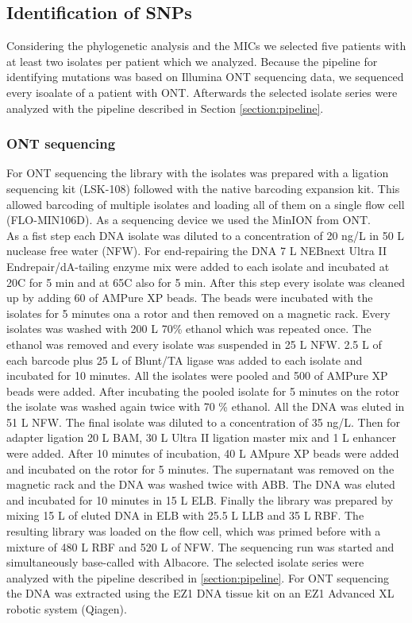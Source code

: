\subsection{Identification of SNPs}
Considering the phylogenetic analysis and the MICs we selected five patients with at least two isolates per patient which we analyzed. Because the pipeline for identifying mutations was based on Illumina ONT sequencing data, we sequenced every isoalate of a patient with ONT. 
Afterwards the selected isolate series were analyzed with the pipeline described in Section \ref{section:pipeline}.
\subsubsection{ONT sequencing}
For ONT sequencing the library with the isolates was prepared with a ligation sequencing kit (LSK-108) followed with the native barcoding expansion kit. This allowed barcoding of multiple isolates and loading all of them on a single flow cell (FLO-MIN106D). As a sequencing device we used the MinION from ONT. \\
As a fist step each DNA isolate was diluted to a concentration of 20 ng/\textmu L in 50 \textmu L nuclease free water (NFW). For end-repairing the DNA 7 \textmu L NEBnext Ultra II Endrepair/dA-tailing enzyme mix were added to each
isolate and incubated at 20\degree C for 5 min and at 65\degree C also for 5 min. After this step every isolate was cleaned up by adding 60 \textmu of AMPure XP beads. The beads were incubated with the isolates for 5 minutes ona a rotor and then removed on a magnetic rack. Every isolates was washed with 200 \textmu L 70\% ethanol which was repeated once. The ethanol was removed and every isolate was suspended in 25 \textmu L NFW. 2.5 \textmu L of each barcode plus 25 \textmu L of Blunt/TA ligase was added to each isolate and incubated for 10 minutes. All the isolates were pooled and 500 \textmu of AMPure XP beads were added. After incubating the pooled isolate for 5 minutes on the rotor the isolate was washed again twice with 70 \% ethanol. All the DNA was eluted in 51 \textmu L NFW. The final isolate was diluted to a concentration of 35 ng/\textmu L. Then for adapter ligation 20 \textmu L BAM, 30 \textmu L Ultra II ligation master mix and 1 \textmu L enhancer were added. After 10 minutes of incubation, 40 \textmu L AMpure XP beads were added and incubated on the rotor for 5 minutes. The supernatant was removed on the magnetic rack and the DNA was washed twice with ABB. The DNA was eluted and incubated for 10 minutes in 15 \textmu L ELB. Finally the library was prepared by mixing 15 \textmu L of eluted DNA in ELB with 25.5 \textmu L LLB and 35 \textmu L RBF. The resulting library was loaded on the flow cell, which was primed before with a mixture of 480 \textmu L RBF  and 520 \textmu L of NFW. The sequencing run was started and simultaneously base-called with Albacore.
\label{section:nanopore_sequenicng}
The selected isolate series were analyzed with the pipeline described in \ref{section:pipeline}. For ONT sequencing the DNA was extracted using the EZ1 DNA tissue kit on an EZ1 Advanced XL robotic system (Qiagen).

